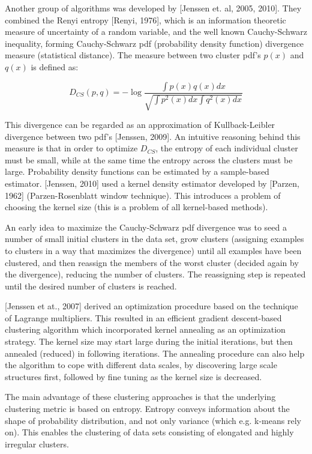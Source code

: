 \documentclass[conference]{IEEEtran}
\begin{document}
Another group of algorithms was developed by [Jenssen et. al, 2005, 2010]. They combined
the Renyi entropy [Renyi, 1976], which is an information theoretic measure of uncertainty of a random variable,
and the well known Cauchy-Schwarz inequality, forming Cauchy-Schwarz pdf (probability density function)
divergence measure (statistical distance). The measure between two cluster pdf's $p(x)$ and $q(x)$ is defined as:

\begin{equation}
\label{CS}
D_{CS}(p, q) = -\log \frac{\int p(x)q(x)dx}{\sqrt{\int p^2(x)dx \int q^2(x)dx}}
\end{equation}

This divergence can be regarded as an approximation of Kullback-Leibler divergence between two pdf's [Jenssen, 2009].
An intuitive reasoning behind this measure is that in order to optimize $D_{CS}$, the entropy of each individual cluster must
be small, while at the same time the entropy across the clusters must be large.
Probability density functions can be estimated by a sample-based estimator. [Jenssen, 2010] used a kernel
density estimator developed by [Parzen, 1962] (Parzen-Rosenblatt window technique). This introduces a problem of
choosing the kernel size (this is a problem of all kernel-based methods).

An early idea to maximize the Cauchy-Schwarz pdf divergence was to seed a number
of small initial clusters in the data set, grow clusters (assigning examples to clusters
in a way that maximizes the divergence) until all examples have been clustered, and then
reassign the members of the worst cluster (decided again by the divergence), reducing the number of clusters. 
The reassigning step is repeated until the desired number of clusters is reached.

[Jenssen et at., 2007] derived an optimization procedure based on the technique of Lagrange multipliers.
This resulted in an efficient gradient descent-based clustering algorithm which incorporated kernel annealing
as an optimization strategy. The kernel size may start large during the initial iterations, but then annealed (reduced)
in following iterations. The annealing procedure can also help the algorithm to cope with different data scales,
by discovering large scale structures first, followed by fine tuning as the kernel size is decreased.

The main advantage of these clustering approaches is that the underlying clustering metric is
based on entropy. Entropy conveys information about the shape of probability distribution,
and not only variance (which e.g. k-means rely on). This enables the clustering of data sets consisting of
elongated and highly irregular clusters.
\end{document}
